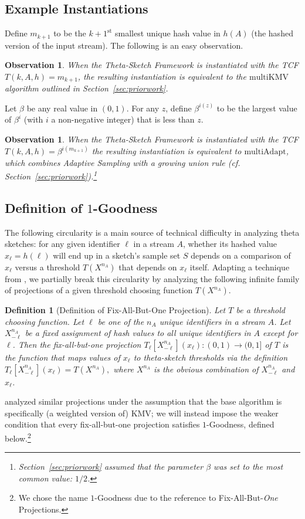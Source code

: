 \documentclass{article}
\newcommand{\xnml}{X^{n_A}_{-\ell}}
\newtheorem{definition}[theorem]{Definition}
\newtheorem{observation}[theorem]{Observation}
\newcommand{\romIAdapt}{\mathrm{multiAdapt}}
\newcommand{\romIKMV}{\mathrm{multiKMV}}
\begin{document}
\subsection{Example Instantiations}
\label{sec:exampleinstantiations} 
Define $m_{k+1}$ to be the $k\!+\!1^{\text{st}}$ smallest unique hash value in 
$h(A)$ (the hashed version of the input stream).
The following is an easy observation. 
\begin{observation}
\label{obs:kmv}
When the Theta-Sketch Framework is instantiated with the TCF $T(k,A,h) = m_{k+1}$, 
the resulting instantiation is equivalent to the $\romIKMV$
algorithm outlined in  
Section~\ref{sec:priorwork}.
\end{observation}
Let $\beta$ be any real value in $(0,1)$. For any $z$, define $\beta^{i(z)}$ to be the 
largest value of $\beta^i$ (with $i$ a
non-negative integer) that is less than $z$. 
\begin{observation} 
\label{obs:adapt}
When the Theta-Sketch Framework is instantiated with the TCF $T(k,A,h) = \beta^{i(m_{k+1})}$
the resulting instantiation is equivalent to $\romIAdapt$, which 
combines Adaptive Sampling with a growing union rule (cf. Section~\ref{sec:priorwork}).\footnote{ 
Section~\ref{sec:priorwork} assumed that the parameter $\beta$ was set to the most common value: $1/2$.}
\end{observation}

\subsection{Definition of $1$-Goodness}\label{sec:sufficient-condition}


The following circularity is a main source of technical difficulty in analyzing theta
sketches:
for any given identifier $\ell$ in a stream $A$, whether its hashed value $x_\ell = h(\ell)$
will end up in a sketch's sample set $S$ depends on a comparison of $x_\ell$ versus a threshold $T(X^{n_A})$ that
depends on $x_\ell$ itself.
Adapting a technique from \cite{cohen2009leveraging}, we partially break this circularity by analyzing 
the following infinite family of projections of a given threshold choosing function $T(X^{n_A})$. 

\begin{definition}[Definition of Fix-All-But-One Projection]\label{def:fabo-projection}
Let $T$ be a threshold choosing function.
Let $\ell$ be one of the $n_A$ unique identifiers in a stream $A$. Let $\xnml$ be a fixed assignment of 
hash values to all unique identifiers in $A$ {\em except} for $\ell$. 
Then the fix-all-but-one projection $T_\ell[\xnml](x_\ell) : (0,1) \rightarrow (0,1]$ of $T$
is the function that maps values of $x_\ell$ to theta-sketch thresholds via the definition
$T_\ell[\xnml](x_\ell) = T(X^{n_A}),$ where $X^{n_A}$ is the obvious combination of $\xnml$ and $x_\ell$.
\end{definition}
\cite{cohen2009leveraging} analyzed similar projections under the assumption
that the base algorithm is specifically (a weighted version of) KMV; we will instead 
impose the weaker condition that every fix-all-but-one projection satisfies $1$-Goodness, defined below.\footnote{We chose the name $1$-Goodness due to the reference to Fix-All-But-\emph{One} Projections.}
\end{document}
